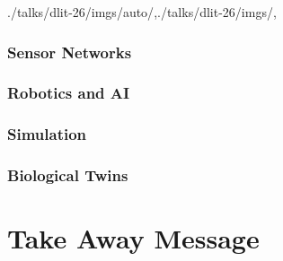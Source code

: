 \begin{bibliographysection}
\begin{graphicspathcontext}{{./talks/dlit-26/imgs/auto/},{./talks/dlit-26/imgs/},\old}
\section{Sensor Networks}
\localized

\section{Robotics and AI}
\localized
\localized

\section{Simulation}
\localized

\section{Biological Twins}
\localized

\part{Take Away Message}

\localized

\appendix

\localized

\localized
\localized
\localized
\localized

\end{graphicspathcontext}
\end{bibliographysection}

\endinput
